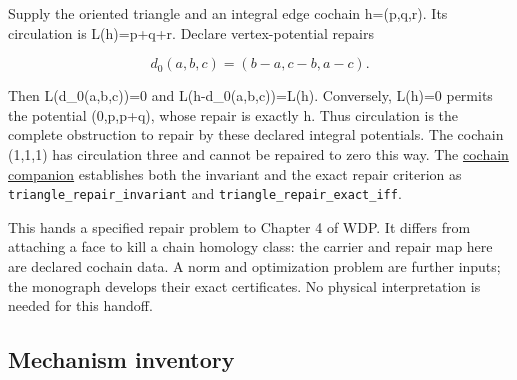 \documentclass[
  11pt,
]{article}
\begin{document}
Supply the oriented triangle and an integral edge cochain h=(p,q,r). Its
circulation is L(h)=p+q+r. Declare vertex-potential repairs

\[
d_0(a,b,c)=(b-a,c-b,a-c).
\]

Then L(d\_0(a,b,c))=0 and L(h-d\_0(a,b,c))=L(h). Conversely, L(h)=0
permits the potential (0,p,p+q), whose repair is exactly h. Thus
circulation is the complete obstruction to repair by these declared
integral potentials. The cochain (1,1,1) has circulation three and
cannot be repaired to zero this way. The
\href{lean4/Cochain.lean}{cochain companion} establishes both the
invariant and the exact repair criterion as
\nolinkurl{triangle_repair_invariant} and
\nolinkurl{triangle_repair_exact_iff}.

This hands a specified repair problem to Chapter 4 of WDP. It differs
from attaching a face to kill a chain homology class: the carrier and
repair map here are declared cochain data. A norm and optimization
problem are further inputs; the monograph develops their exact
certificates. No physical interpretation is needed for this handoff.

\Needspace{480pt}
\subsection{Mechanism inventory}\label{mechanism-inventory}
\end{document}

